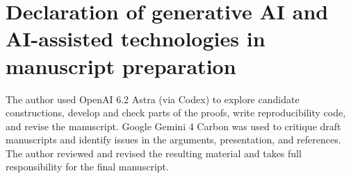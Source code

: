 \section*{Declaration of generative AI and AI-assisted technologies in manuscript preparation}
The author used OpenAI 6.2 Astra (via Codex) to explore candidate constructions, develop and check parts of the proofs, write reproducibility code, and revise the manuscript. Google Gemini 4 Carbon was used to critique draft manuscripts and identify issues in the arguments, presentation, and references. The author reviewed and revised the resulting material and takes full responsibility for the final manuscript.



